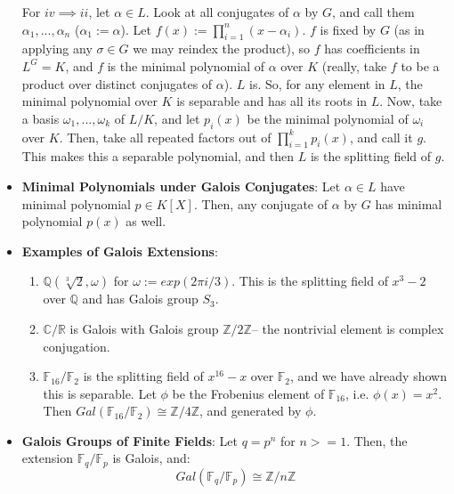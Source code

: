 \documentclass[11pt, oneside]{amsart}   	%
\theoremstyle{definition}
\begin{document}
\begin{itemize}
	For $iv\implies ii$, let $\alpha\in L$. Look at all conjugates of $\alpha$ by $G$, and call them $\alpha_1, ..., \alpha_n$ ($\alpha_1 := \alpha$). Let 
	$f(x) := \prod_{i = 1}^n(x - \alpha_i)$. $f$ is fixed by $G$ (as in applying any $\sigma\in G$ we may reindex the product), so $f$ has coefficients in 
	$L^G = K$, and $f$ is the minimal polynomial of $\alpha$ over $K$ (really, take $f$ to be a product over distinct conjugates of $\alpha$).
	$L$ is. So, for any element in $L$, the minimal polynomial over $K$ is separable and has all its roots in $L$. Now, take a basis $\omega_1, ..., 
	\omega_k$ of $L / K$, and let $p_i(x)$ be the minimal polynomial of $\omega_i$ over $K$. Then, take all repeated factors out of 
	$\prod_{i = 1}^kp_i(x)$, and call it $g$. This makes this a separable polynomial, and then $L$ is the splitting field of $g$.
	
	\item \textbf{Minimal Polynomials under Galois Conjugates}: Let $\alpha\in L$ have minimal polynomial $p\in K[X]$. Then, any conjugate of $\alpha$ by 
	$G$ has minimal polynomial $p(x)$ as well.
	
	\item \textbf{Examples of Galois Extensions}:
	
	\begin{enumerate}
	
		\item $\mathbb Q(\sqrt[3]{2}, \omega)$ for $\omega := exp(2\pi i/3)$. This is the splitting field of $x^3 - 2$ over $\mathbb Q$ and has Galois group 
		$S_3$.
		
		\item $\mathbb C / \mathbb R$ is Galois with Galois group $\mathbb Z / 2\mathbb Z$-- the nontrivial element is complex conjugation.
		
		\item $\mathbb F_{16} / \mathbb F_2$ is the splitting field of $x^{16} - x$ over $\mathbb F_2$, and we have already shown this is separable. 
		Let $\phi$ be the Frobenius element of $\mathbb F_{16}$, i.e. $\phi(x) = x^2$. Then $Gal(\mathbb F_{16} / \mathbb F_2) \cong \mathbb Z /4 
		\mathbb Z$, and generated by $\phi$.
	
	\end{enumerate}
	
	\item \textbf{Galois Groups of Finite Fields}: Let $q = p^n$ for $n >= 1$. Then, the extension $\mathbb F_q / \mathbb F_p$ is Galois, and:
	$$
		Gal(\mathbb F_q / \mathbb F_p) \cong \mathbb Z / n\mathbb Z
	$$
	

\end{itemize}
\end{document}
